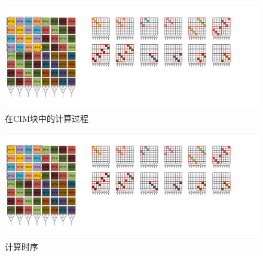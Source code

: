 \documentclass[12pt,a4paper]{article}
\begin{document}
\begin{figure}[htbp]
\centering
\includegraphics[scale=0.3]{figure/figure3}
\caption{在CIM块中的计算过程}
\end{figure}



\begin{figure}[htbp]
\centering
\includegraphics[scale=0.2]{figure/figure4}
\caption{计算时序}
\end{figure}
\end{document}

